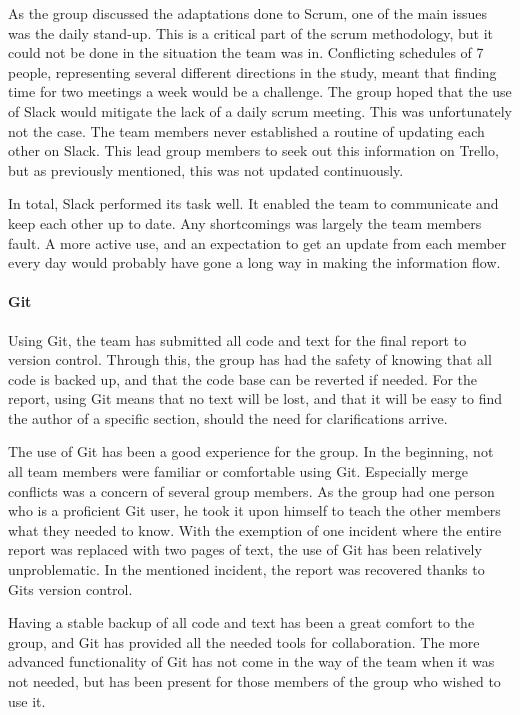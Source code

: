 \documentclass[11pt,a4paper,titlepage,oneside]{report}
\begin{document}
As the group discussed the adaptations done to Scrum, one of the main issues was the daily stand-up. This is a critical part of the scrum methodology, but it could not be done in the situation the team was in. Conflicting schedules of 7 people, representing several different directions in the study, meant that finding time for two meetings a week would be a challenge. The group hoped that the use of Slack would mitigate the lack of a daily scrum meeting. This was unfortunately not the case. The team members never established a routine of updating each other on Slack. This lead group members to seek out this information on Trello, but as previously mentioned, this was not updated continuously. 

In total, Slack performed its task well. It enabled the team to communicate and keep each other up to date. Any shortcomings was largely the team members fault. A more active use, and an expectation to get an update from each member every day would probably have gone a long way in making the information flow.

\paragraph{Git}
Using Git, the team has submitted all code and text for the final report to version control. Through this, the group has had the safety of knowing that all code is backed up, and that the code base can be reverted if needed. For the report, using Git means that no text will be lost, and that it will be easy to find the author of a specific section, should the need for clarifications arrive. 

The use of Git has been a good experience for the group. In the beginning, not all team members were familiar or comfortable using Git. Especially merge conflicts was a concern of several group members. As the group had one person who is a proficient Git user, he took it upon himself to teach the other members what they needed to know. With the exemption of one incident where the entire report was replaced with two pages of text, the use of Git has been relatively unproblematic. In the mentioned incident, the report was recovered thanks to Gits version control. 

Having a stable backup of all code and text has been a great comfort to the group, and Git has provided all the needed tools for collaboration. The more advanced functionality of Git has not come in the way of the team when it was not needed, but has been present for those members of the group who wished to use it.
\end{document}
